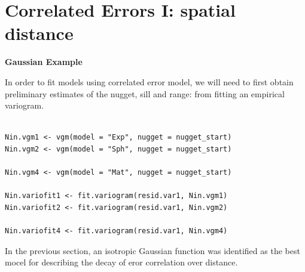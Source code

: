 \documentclass[]{book}
\newenvironment{Shaded}{\begin{snugshade}}{\end{snugshade}}
\newcommand{\DataTypeTok}[1]{\textcolor[rgb]{0.13,0.29,0.53}{#1}}
\newcommand{\DecValTok}[1]{\textcolor[rgb]{0.00,0.00,0.81}{#1}}
\newcommand{\FloatTok}[1]{\textcolor[rgb]{0.00,0.00,0.81}{#1}}
\newcommand{\KeywordTok}[1]{\textcolor[rgb]{0.13,0.29,0.53}{\textbf{#1}}}
\newcommand{\NormalTok}[1]{#1}
\newcommand{\OperatorTok}[1]{\textcolor[rgb]{0.81,0.36,0.00}{\textbf{#1}}}
\newcommand{\StringTok}[1]{\textcolor[rgb]{0.31,0.60,0.02}{#1}}
\begin{document}
\hypertarget{correlated-errors-i-spatial-distance}{%
\section{Correlated Errors I: spatial distance}\label{correlated-errors-i-spatial-distance}}

\textbf{Gaussian Example}

In order to fit models using correlated error model, we will need to first obtain preliminary estimates of the nugget, sill and range: from fitting an empirical variogram.

\begin{Shaded}
\end{Shaded}

\begin{verbatim}

Nin.vgm1 <- vgm(model = "Exp", nugget = nugget_start) 
Nin.vgm2 <- vgm(model = "Sph", nugget = nugget_start) 

Nin.vgm4 <- vgm(model = "Mat", nugget = nugget_start)

Nin.variofit1 <- fit.variogram(resid.var1, Nin.vgm1)
Nin.variofit2 <- fit.variogram(resid.var1, Nin.vgm2)

Nin.variofit4 <- fit.variogram(resid.var1, Nin.vgm4)
\end{verbatim}

In the previous section, an isotropic Gaussian function was identified as the best mocel for describing the decay of eror correlation over distance.
\end{document}

